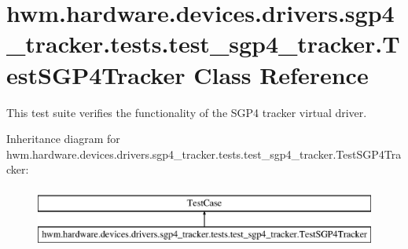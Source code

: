 \hypertarget{classhwm_1_1hardware_1_1devices_1_1drivers_1_1sgp4__tracker_1_1tests_1_1test__sgp4__tracker_1_1_test_s_g_p4_tracker}{\section{hwm.\-hardware.\-devices.\-drivers.\-sgp4\-\_\-tracker.\-tests.\-test\-\_\-sgp4\-\_\-tracker.\-Test\-S\-G\-P4\-Tracker Class Reference}
\label{classhwm_1_1hardware_1_1devices_1_1drivers_1_1sgp4__tracker_1_1tests_1_1test__sgp4__tracker_1_1_test_s_g_p4_tracker}
}


This test suite verifies the functionality of the S\-G\-P4 tracker virtual driver.  


Inheritance diagram for hwm.\-hardware.\-devices.\-drivers.\-sgp4\-\_\-tracker.\-tests.\-test\-\_\-sgp4\-\_\-tracker.\-Test\-S\-G\-P4\-Tracker\-:\begin{figure}[H]
\begin{center}
\leavevmode
\includegraphics[height=2.000000cm]{classhwm_1_1hardware_1_1devices_1_1drivers_1_1sgp4__tracker_1_1tests_1_1test__sgp4__tracker_1_1_test_s_g_p4_tracker}
\end{center}
\end{figure}
